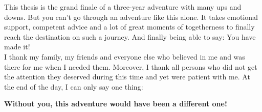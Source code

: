 This thesis is the grand finale of a three-year adventure with many ups and downs. But you can't go through an adventure like this alone. It takes emotional support, competent advice and a lot of great moments of togetherness to finally reach the destination on such a journey. And finally being able to say: You have made it!
\\

\noindent I thank my family, my friends and everyone else who believed in me and was there for me when I needed them. Moreover, I thank all persons who did not get the attention they deserved during this time and yet were patient with me. At the end of the day, I can only say one thing:
\begin{center}
    \textbf{Without you, this adventure would have been a different one!}
\end{center}